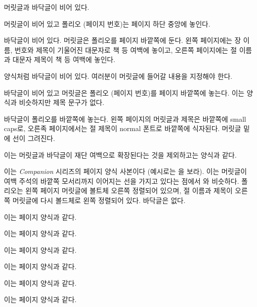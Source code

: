 \begin{plainlist}
\item[\pstyle{empty}] 머릿글과 바닥글이
  비어 있다.
\item[\pstyle{plain}] 머릿글이 비어 있고
     폴리오 (페이지 번호)는 페이지 하단 중앙에 놓인다.
\item[\pstyle{headings}] 바닥글이 비어 있다.
     머릿글은 폴리오를 페이지 바깥쪽에
     둔다. 왼쪽 페이지에는 장 이름, 번호와 제목이 기울어진 대문자로 책 등
     여백에 놓이고, 오른쪽 페이지에는 절 이름과 대문자 제목이 책 등 여백에
     놓인다.
\item[\pstyle{myheadings}]  양식처럼 바닥글이 비어 있다.
     여러분이 머릿글에 들어갈 내용을 지정해야 한다.
\item[\pstyle{simple}] 바닥글이 비어 있고
     머릿글은 폴리오 (페이지 번호)를
     페이지 바깥쪽에 놓는다.
     이는  양식과 비슷하지만 제목 문구가 없다.
\item[\pstyle{ruled}] 바닥글이
     폴리오를 바깥쪽에 놓는다.
     왼쪽 페이지의 머릿글과 제목은 바깥쪽에 small caps로,
     오른족 페이지에서는 절 제목이 normal 폰트로 바깥쪽에 식자된다.
     머릿글 밑에 선이 그려진다.
\item[\pstyle{Ruled}] 이는 머릿글과
     바닥글이 재단
     여백으로 확장된다는 것을
     제외하고는  양식과 같다.
\item[\pstyle{companion}] 이는 \textit{Companion} 시리즈의 페이지 양식
     사본이다 (예시로는 \cite{COMPANION}을 보라).
     이는 머릿글이 여백 주석의 바깥쪽 모서리까지 이어지는 선을 가지고 있다는
     점에서 와 비슷하다.
     폴리오는 왼쪽 페이지 머릿글에 볼트체 오른쪽 정렬되어 있으며, 절 이름과
     제목이 오른쪽 머릿글에 다시 볼드체로 왼쪽 정렬되어
     있다.
     바닥글은 없다.
\item[\pstyle{book}] 이는  페이지 양식과 같다.
\item[\pstyle{chapter}]  이는  페이지 양식과 같다.
\item[\pstyle{cleared}]  이는  페이지 양식과 같다.
\item[\pstyle{part}] 이는  페이지 양식과 같다.
\item[\pstyle{title}] 이는  페이지 양식과 같다.
\item[\pstyle{titlingpage}] 이는  페이지 양식과 같다.
\end{plainlist}

